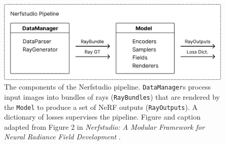 \begin{figure}[h]
    \centering
    \includegraphics[width=1.0\textwidth]{figures/nerfstudio-pipeline-components.png}
    \caption[The components of the Nerfstudio pipeline.]{The components of the Nerfstudio pipeline. \texttt{DataManager}s process input images into bundles of rays (\texttt{RayBundles}) that are rendered by the \texttt{Model} to produce a set of NeRF outputs (\texttt{RayOutputs}). A dictionary of losses supervises the pipeline. Figure and caption adapted from Figure 2 in \textit{Nerfstudio: A Modular Framework for Neural Radiance Field Development} \cite{tancik_nerfstudio_2023}.}
    \label{fig:nerfstudio-pipeline-components}
\end{figure}